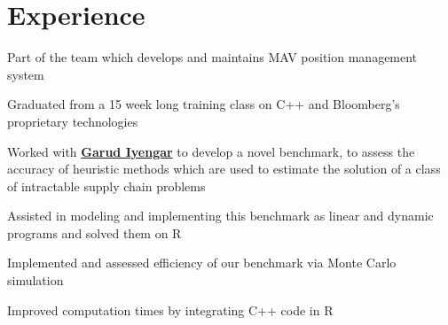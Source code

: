 \documentclass[letterpaper]{deedy-resume} %
\begin{document}
\hfill
%
%
\begin{minipage}[t]{0.66\textwidth} %


\section{Experience}


\vspace{\topsep} %
\begin{tightitemize}
\item Part of the team which develops and maintains MAV position management system
\item Graduated from a 15 week long training class on C++ and Bloomberg's proprietary technologies
\end{tightitemize}

\sectionspace %



\begin{tightitemize}
\item Worked with \textbf{\href{http://ieor.columbia.edu/garud-n-iyengar}{Garud Iyengar}} to develop a novel benchmark, to assess the accuracy of heuristic methods which are used to estimate the solution of a class of intractable supply chain problems
\item Assisted in modeling and implementing this benchmark as linear and dynamic programs and solved them on R
\item Implemented and assessed efficiency of our benchmark via Monte Carlo simulation
\item Improved computation times by integrating C++ code in R
\end{tightitemize}


\end{minipage}
\end{document}
